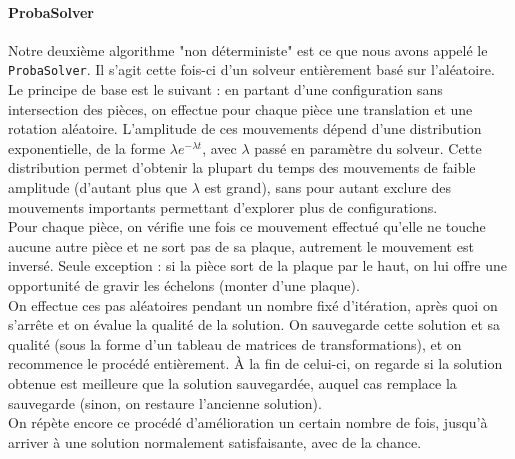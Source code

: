\paragraph{ProbaSolver}
Notre deuxième algorithme "non déterministe" est ce que nous avons appelé le \texttt{ProbaSolver}. Il s'agit cette fois-ci d'un solveur entièrement basé sur l'aléatoire. Le principe de base est le suivant : en partant d'une configuration sans intersection des pièces, on effectue pour chaque pièce une translation et une rotation aléatoire. L'amplitude de ces mouvements dépend d'une distribution exponentielle, de la forme $\lambda e^{-\lambda t}$, avec $\lambda$ passé en paramètre du solveur. Cette distribution permet d'obtenir la plupart du temps des mouvements de faible amplitude (d'autant plus que $\lambda$ est grand), sans pour autant exclure des mouvements importants permettant d'explorer plus de configurations.\\

Pour chaque pièce, on vérifie une fois ce mouvement effectué qu'elle ne touche aucune autre pièce et ne sort pas de sa plaque, autrement le mouvement est inversé. Seule exception : si la pièce sort de la plaque par le haut, on lui offre une opportunité de gravir les échelons (monter d'une plaque).\\

On effectue ces pas aléatoires pendant un nombre fixé d'itération, après quoi on s'arrête et on évalue la qualité de la solution. On sauvegarde cette solution et sa qualité (sous la forme d'un tableau de matrices de transformations), et on recommence le procédé entièrement. À la fin de celui-ci, on regarde si la solution obtenue est meilleure que la solution sauvegardée, auquel cas remplace la sauvegarde (sinon, on restaure l'ancienne solution).\\

On répète encore ce procédé d'amélioration un certain nombre de fois, jusqu'à arriver à une solution normalement satisfaisante, avec de la chance.


